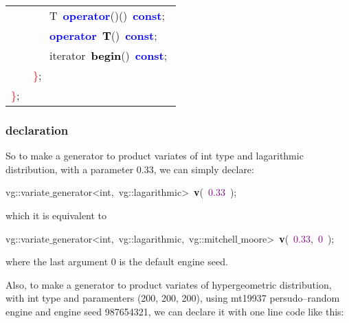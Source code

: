 \begin{small}
\begin{ttfamily}
\begin{center}
\begin{longtable}{|l|}
\mbox{}\ \ \ \ \ \ \ \textcolor{TealBlue}{T}\ \textbf{\textcolor{Blue}{operator}}\textcolor{BrickRed}{()()}\ \textbf{\textcolor{Blue}{const}}\textcolor{BrickRed}{;}\  \\
\mbox{}\ \ \ \ \ \ \ \textbf{\textcolor{Blue}{operator}}\ \textbf{\textcolor{Black}{T}}\textcolor{BrickRed}{()}\ \textbf{\textcolor{Blue}{const}}\textcolor{BrickRed}{;} \\
\mbox{}\ \ \ \ \ \ \ \textcolor{TealBlue}{iterator}\ \textbf{\textcolor{Black}{begin}}\textcolor{BrickRed}{()}\ \textbf{\textcolor{Blue}{const}}\textcolor{BrickRed}{;} \\
\mbox{}\ \ \ \ \textcolor{Red}{\}}\textcolor{BrickRed}{;} \\
\mbox{}\textcolor{Red}{\}}\textcolor{BrickRed}{;} \\
\hline
\end{longtable}
\end{center}

\end{ttfamily}
\end{small}

\subsubsection{declaration}

So to make a generator to product variates of int type and lagarithmic distribution, with a parameter 0.33, we can simply declare:

\noindent
\mbox{}vg\textcolor{BrickRed}{::}\textcolor{TealBlue}{variate$\_$generator\textless{}int,\ vg::lagarithmic\textgreater{}}\ \textbf{\textcolor{Black}{v}}\textcolor{BrickRed}{(}\ \textcolor{Purple}{0.33}\ \textcolor{BrickRed}{);} \\
\mbox{}

which it is equivalent to 

\noindent
\mbox{}vg\textcolor{BrickRed}{::}\textcolor{TealBlue}{variate$\_$generator\textless{}int,\ vg::lagarithmic,\ vg::mitchell$\_$moore\textgreater{}}\ \textbf{\textcolor{Black}{v}}\textcolor{BrickRed}{(}\ \textcolor{Purple}{0.33}\textcolor{BrickRed}{,}\ \textcolor{Purple}{0}\ \textcolor{BrickRed}{);} \\
\mbox{}

where the last argument 0 is the default engine seed.

Also, to make a generator to product variates of hypergeometric distribution, with int type and paramenters (200, 200, 200), using mt19937 persudo--random engine and engine seed 987654321, we can declare it with one line code like this:

